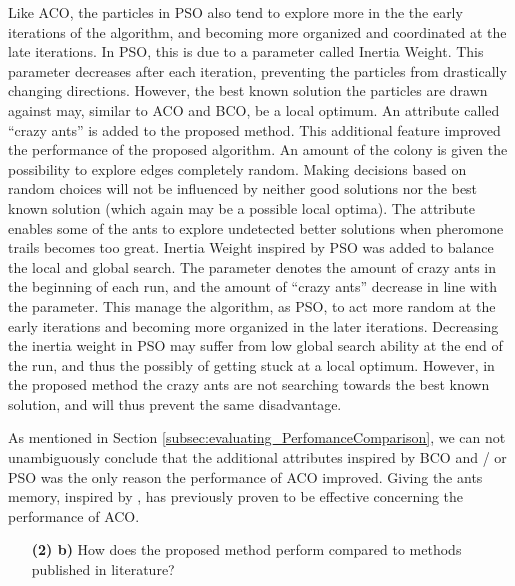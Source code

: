 Like ACO, the particles in PSO also tend to explore more in the the early iterations of the algorithm, and becoming more organized and coordinated at the late iterations. In PSO, this is due to a parameter called  Inertia Weight. This parameter decreases after each iteration, preventing the particles from drastically changing directions. However, the best known solution the particles are drawn against may, similar to ACO and BCO, be a local optimum. An attribute called ``crazy ants'' is added to the proposed method. This additional feature improved the performance of the proposed algorithm. An amount of the colony is given the possibility to explore edges completely random. Making decisions based on random choices will not be influenced by neither good solutions nor the best known solution (which again may be a possible local optima). The attribute enables some of the ants to explore undetected better solutions when pheromone trails becomes too great. Inertia Weight inspired by PSO was added to balance the local and global search. The parameter denotes the amount of crazy ants in the beginning of each run, and the amount of ``crazy ants'' decrease in line with the parameter. This manage the algorithm, as PSO, to act more random at the early iterations and becoming more organized in the later iterations. Decreasing the inertia weight in PSO may suffer from low global search ability at the end of the run, and thus the possibly of getting stuck at a local optimum. However, in the proposed method the crazy ants are not searching towards the best known solution, and will thus prevent the same disadvantage.

As mentioned in Section \vref{subsec:evaluating_PerfomanceComparison}, we can not unambiguously conclude that the additional attributes inspired by BCO and / or PSO was the only reason the performance of ACO improved. Giving the ants memory, inspired by \citet{dorigo96}, has previously proven to be effective concerning the performance of ACO. 

\begin{itemize}
\item[\textbf{(2) b)}] How does the proposed method perform compared to methods published in literature?
\end{itemize}

